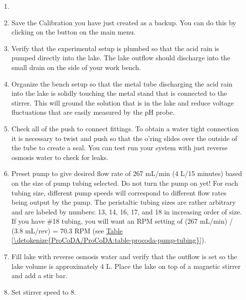 \documentclass[letterpaper,10pt,english]{sphinxmanual}
\begin{document}
\begin{enumerate}
\item {} 
{\hyperref[\detokenize{ProCoDA/ProCoDA:heading-procoda-ph-measurement}]{}}

\item {} 
Save the Calibration you have just created as a backup. You can do this by clicking on the  button on the main menu.

\item {} 
Verify that the experimental setup is plumbed so that the acid rain is pumped directly into the lake.  The lake outflow should discharge into the small drain on the side of your work bench.

\item {} 
Organize the bench setup so that the metal tube discharging the acid rain into the lake is solidly touching the metal stand that is connected to the stirrer. This will ground the solution that is in the lake and reduce voltage fluctuations that are easily measured by the pH probe.

\item {} 
Check all of the push to connect fittings. To obtain a water tight connection it is necessary to twist and push so that the o’ring slides over the outside of the tube to create a seal. You can test run your system with just reverse osmosis water to check for leaks.

\item {} 
Preset pump to give desired flow rate of 267 mL/min (4 L/15 minutes) based on the size of pump tubing selected. Do not turn the pump on yet! For each tubing size, different pump speeds will correspond to different flow rates being output by the pump. The peristaltic tubing sizes are rather arbitrary and are labeled by numbers: 13, 14, 16, 17, and 18 in increasing order of size. If you have \#18 tubing, you will want an RPM setting of (267 mL/min) / (3.8 mL/rev) = 70.3 RPM (see \hyperref[\detokenize{ProCoDA/ProCoDA:table-procoda-pump-tubing}]{Table \ref{\detokenize{ProCoDA/ProCoDA:table-procoda-pump-tubing}}}).

\item {} 
Fill lake with reverse osmosis water and verify that the outflow is set so the lake volume is approximately 4 L.  Place the lake on top of a magnetic stirrer and add a stir bar.

\item {} 
Set stirrer speed to 8.


\end{enumerate}
\end{document}
